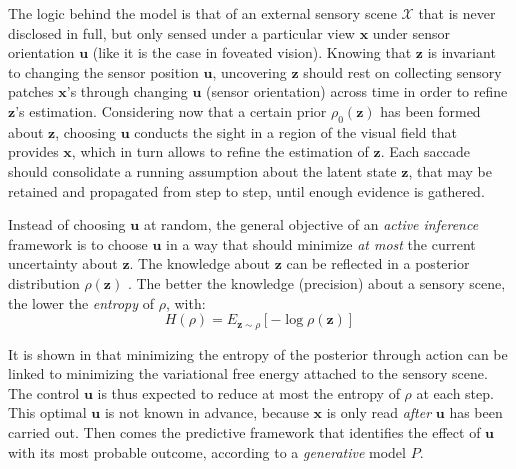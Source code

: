 \documentclass{article} %
\begin{document}
The logic behind the model is that of an external sensory scene $\mathcal{X}$ that is never disclosed in full, but only sensed under a particular view $\boldsymbol{x}$ under sensor orientation $\boldsymbol{u}$ (like it is the case in foveated vision). 
Knowing that $\boldsymbol{z}$ is invariant to changing the sensor position $\boldsymbol{u}$, uncovering $\boldsymbol{z}$ should rest on
collecting sensory patches $\boldsymbol{x}$'s through changing $\boldsymbol{u}$ (sensor orientation) across time in order to refine $\boldsymbol{z}$'s estimation. 
Considering now that a certain prior $\rho_0
(\boldsymbol{z})$ has been formed about $\boldsymbol{z}$, choosing  $\boldsymbol{u}$ conducts the sight in a region of the visual field that provides $\boldsymbol{x}$, which in turn allows to refine the estimation of $\boldsymbol{z}$.
Each saccade should consolidate a running assumption about the latent state $\boldsymbol{z}$, that may be retained and propagated from step to step, until enough evidence is gathered.

Instead of choosing $\boldsymbol{u}$ at random, the general objective of an \emph{active inference} framework is to choose $\boldsymbol{u}$ in a way that should minimize \emph{at most} the current uncertainty about $\boldsymbol{z}$. 
The knowledge about $\boldsymbol{z}$ can be reflected in a posterior distribution $\rho(\boldsymbol{z})$ . The better the knowledge (precision) about a sensory scene, the lower the \emph{entropy} of $\rho$, with:
\begin{equation}
H(\rho) = E_{\boldsymbol{z}\sim \rho}[- \log \rho(\boldsymbol{z})]\label{eq:entropy}
\end{equation}

It is shown in \cite{friston2012perceptions} that minimizing the entropy of the posterior through action can be linked to minimizing the variational free energy attached to the sensory scene. 
The control $\boldsymbol{u}$ is thus expected to reduce at most the entropy of $\rho$ at each step. This optimal $\boldsymbol{u}$ is not known in advance, because $\boldsymbol{x}$ is only read \emph{after} $\boldsymbol{u}$ has been carried out. Then comes the predictive framework that identifies the effect of $\boldsymbol{u}$ with its most probable outcome, according to a \emph{generative} model $P$.
	
\end{document}
